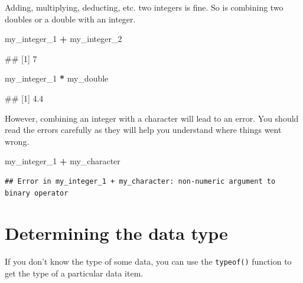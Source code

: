 \documentclass[
]{book}
\newenvironment{Shaded}{\begin{snugshade}}{\end{snugshade}}
\newcommand{\NormalTok}[1]{#1}
\newcommand{\SpecialCharTok}[1]{\textcolor[rgb]{0.81,0.36,0.00}{\textbf{#1}}}
\begin{document}
Adding, multiplying, deducting, etc. two integers is fine. So is combining two doubles or a double with an integer.

\begin{Shaded}
\begin{Highlighting}[]
\NormalTok{my\_integer\_1 }\SpecialCharTok{+}\NormalTok{ my\_integer\_2}
\end{Highlighting}
\end{Shaded}

\begin{Shaded}
\begin{Highlighting}[]
\NormalTok{\#\# [1] 7}
\end{Highlighting}
\end{Shaded}

\begin{Shaded}
\begin{Highlighting}[]
\NormalTok{my\_integer\_1 }\SpecialCharTok{*}\NormalTok{ my\_double}
\end{Highlighting}
\end{Shaded}

\begin{Shaded}
\begin{Highlighting}[]
\NormalTok{\#\# [1] 4.4}
\end{Highlighting}
\end{Shaded}

However, combining an integer with a character will lead to an error. You should read the errors carefully as they will help you understand where things went wrong.

\begin{Shaded}
\begin{Highlighting}[]
\NormalTok{my\_integer\_1 }\SpecialCharTok{+}\NormalTok{ my\_character}
\end{Highlighting}
\end{Shaded}

\begin{verbatim}
## Error in my_integer_1 + my_character: non-numeric argument to binary operator
\end{verbatim}

\section{Determining the data type}\label{determining-the-data-type}

If you don't know the type of some data, you can use the \texttt{typeof()} function to get the type of a particular data item.
\end{document}
